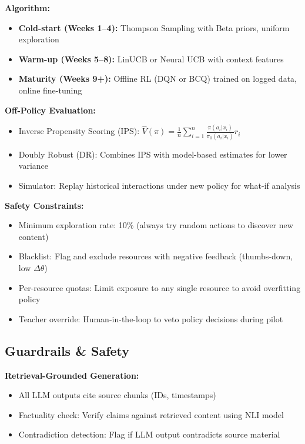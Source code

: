\documentclass[11pt,letterpaper]{article}
\begin{document}
\textbf{Algorithm:}
\begin{itemize}
\item \textbf{Cold-start (Weeks 1--4):} Thompson Sampling with Beta priors, uniform exploration
\item \textbf{Warm-up (Weeks 5--8):} LinUCB or Neural UCB with context features
\item \textbf{Maturity (Weeks 9+):} Offline RL (DQN or BCQ) trained on logged data, online fine-tuning
\end{itemize}

\textbf{Off-Policy Evaluation:}
\begin{itemize}
\item Inverse Propensity Scoring (IPS): $\hat{V}(\pi) = \frac{1}{n} \sum_{i=1}^{n} \frac{\pi(a_i|x_i)}{\pi_0(a_i|x_i)} r_i$
\item Doubly Robust (DR): Combines IPS with model-based estimates for lower variance
\item Simulator: Replay historical interactions under new policy for what-if analysis
\end{itemize}

\textbf{Safety Constraints:}
\begin{itemize}
\item Minimum exploration rate: 10\% (always try random actions to discover new content)
\item Blacklist: Flag and exclude resources with negative feedback (thumbs-down, low $\Delta\theta$)
\item Per-resource quotas: Limit exposure to any single resource to avoid overfitting policy
\item Teacher override: Human-in-the-loop to veto policy decisions during pilot
\end{itemize}

\subsection{Guardrails \& Safety}\label{subsec:guardrails-safety}

\textbf{Retrieval-Grounded Generation:}
\begin{itemize}
\item All LLM outputs cite source chunks (IDs, timestamps)
\item Factuality check: Verify claims against retrieved content using NLI model
\item Contradiction detection: Flag if LLM output contradicts source material
\end{itemize}
\end{document}
